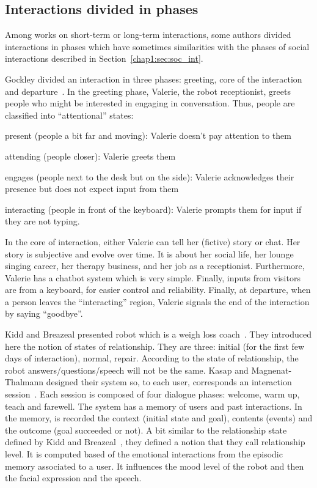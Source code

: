 \documentclass[a4paper,11pt,twoside]{StyleThese}
\begin{document}
\subsection{Interactions divided in phases}\label{chap2:subsec:inter_div}
Among works on short-term or long-term interactions, some authors divided interactions in phases which have sometimes similarities with the phases of social interactions described in Section~\ref{chap1:sec:soc_int}.

Gockley \etal{} divided an interaction in three phases: greeting, core of the interaction and departure~\cite{gockley_2005_designing}. In the greeting phase, Valerie, the robot receptionist, greets people who might be interested in engaging in conversation. Thus, people are classified into ``attentional'' states:
\begin{bulletList}
	\item present (people a bit far and moving): Valerie doesn’t pay attention to them
	\item attending (people closer): Valerie greets them
	\item engages (people next to the desk but on the side): Valerie acknowledges their presence but does not expect input from them
	\item interacting (people in front of the keyboard): Valerie prompts them for input if they are not typing.
\end{bulletList}
In the core of interaction, either Valerie can tell her (fictive) story or chat. Her story is subjective and evolve over time. It is about her social life, her lounge singing career, her therapy business, and her job as a receptionist. Furthermore, Valerie has a chatbot system which is very simple. Finally, inputs from visitors are from a keyboard, for easier control and reliability. Finally, at departure, when a person leaves the ``interacting'' region, Valerie signals the end of the interaction by saying ``goodbye''. 

Kidd and Breazeal presented robot which is a weigh loss coach~\cite{kidd_2008_robots}. They introduced here the notion of states of relationship. They are three: initial (for the first few days of interaction), normal, repair. According to the state of relationship, the robot answers/questions/speech will not be the same. Kasap and Magnenat-Thalmann designed their system so, to each user, corresponds an interaction session~\cite{kasap_2012_building}. Each session is composed of four dialogue phases: welcome, warm up, teach and farewell. The system has a memory of users and past interactions. In the memory, is recorded the context (initial state and goal), contents (events) and the outcome (goal succeeded or not). A bit similar to the relationship state defined by Kidd and Breazeal~\cite{kidd_2008_robots}, they defined a notion that they call relationship level. It is computed based of the emotional interactions from the episodic memory associated to a user. It influences the mood level of the robot and then the facial expression and the speech.
\end{document}
